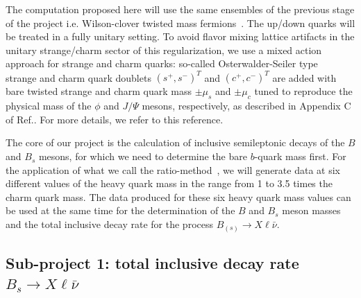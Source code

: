 \label{sec:proj}

The computation proposed here will use the same ensembles of the previous stage of the project
i.e. Wilson-clover twisted
mass fermions~\cite{Alexandrou:2018egz}. The up/down quarks will be treated
in a fully unitary setting. To avoid flavor mixing lattice artifacts
in the unitary strange/charm sector of this regularization, we use a
mixed action approach for strange and charm quarks: so-called
Osterwalder-Seiler type~\cite{Frezzotti:2004wz} strange and charm quark doublets
$(s^+ , s^-)^T$ and $(c^+ , c^- )^T$ are added with bare
twisted strange and charm quark mass $\pm \mu_s$ and $\pm \mu_c$
tuned to reproduce the physical mass of the $\phi$ and $J/\Psi$
mesons, respectively, as described in Appendix C of
Ref.\cite{ExtendedTwistedMass:2022jpw}. For more details, we refer to
this reference.


The core of our project is the calculation of inclusive semileptonic
decays of the $B$ and $B_s$ mesons, for which we need to determine the
bare $b$-quark mass first.
For the application of what we call the
ratio-method~\cite{ETM:2009sed}, we will generate data at six
different values of the heavy quark mass in the range from 
1 to 3.5 times the charm quark mass. 
The data produced for these six heavy quark mass values can be used at
the same time for the  determination of the $B$ and $B_s$ meson masses
and the total inclusive decay rate for the process $B_{(s)} \to
X\ell\bar\nu$. 



\subsection{Sub-project 1: total inclusive decay rate $B_s \to X\ell\bar\nu$}

